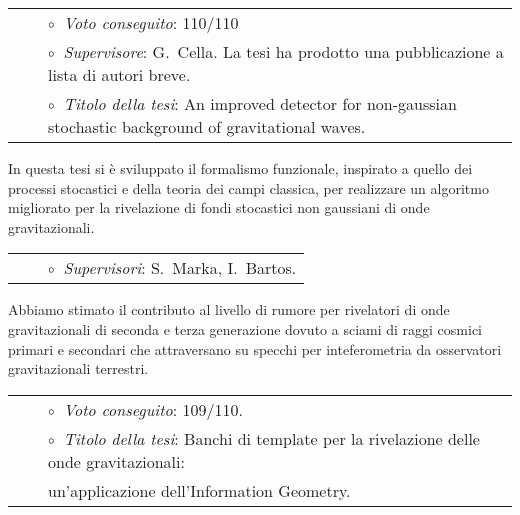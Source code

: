 \vspace{0.2cm}
\vspace{-0.1cm}
\begin{tabular}{rcl}
&\hspace{0.4cm} &$\circ\;\;${\textit{Voto conseguito}}: 110/110\\
&\hspace{0.4cm} &$\circ\;\;${\textit{Supervisore}}: G.~Cella. La tesi ha prodotto una pubblicazione a lista di autori breve.\\
&\hspace{0.4cm} &$\circ\;\;${\textit{Titolo della tesi}}: 
An improved detector for non-gaussian stochastic background of gravitational waves.
\end{tabular}
\vspace{0.2cm}

In questa tesi si è sviluppato il formalismo funzionale, inspirato a quello dei processi stocastici e della teoria dei campi classica, per realizzare un algoritmo migliorato per la rivelazione di fondi stocastici non gaussiani di onde gravitazionali.

\vspace{0.2cm}
\vspace{-0.1cm}
\begin{tabular}{rcl}
&\hspace{0.4cm} &$\circ\;\;${\textit{Supervisori}}: S.~Marka, I.~Bartos.
\end{tabular}
\vspace{0.2cm}

Abbiamo stimato il contributo al livello di rumore per rivelatori di onde gravitazionali di seconda e terza generazione dovuto a sciami di raggi cosmici primari e secondari che attraversano su specchi per inteferometria da osservatori gravitazionali terrestri.

\vspace{0.2cm}
\vspace{-0.1cm}
\begin{tabular}{rcl}
&\hspace{0.4cm} &$\circ\;\;${\textit{Voto conseguito}}: 109/110.\\
&\hspace{0.4cm} &$\circ\;\;${\textit{Titolo della tesi}}: Banchi di template per la rivelazione delle onde gravitazionali:\\
&\hspace{0.4cm} &\phantom{$\circ\;\;${\textit{Titolo della tesi}} } un'applicazione dell'Information Geometry.
\end{tabular}
\vspace{0.2cm}


